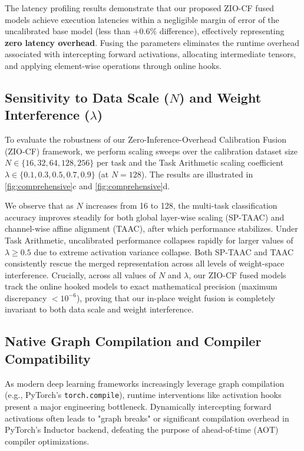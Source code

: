 \documentclass{article}
\begin{document}
The latency profiling results demonstrate that our proposed ZIO-CF fused models achieve execution latencies within a negligible margin of error of the uncalibrated base model (less than $+0.6\%$ difference), effectively representing \textbf{zero latency overhead}. Fusing the parameters eliminates the runtime overhead associated with intercepting forward activations, allocating intermediate tensors, and applying element-wise operations through online hooks.

\subsection{Sensitivity to Data Scale ($N$) and Weight Interference ($\lambda$)}
To evaluate the robustness of our Zero-Inference-Overhead Calibration Fusion (ZIO-CF) framework, we perform scaling sweeps over the calibration dataset size $N \in \{16, 32, 64, 128, 256\}$ per task and the Task Arithmetic scaling coefficient $\lambda \in \{0.1, 0.3, 0.5, 0.7, 0.9\}$ (at $N=128$). The results are illustrated in \cref{fig:comprehensive}c and \cref{fig:comprehensive}d.

We observe that as $N$ increases from 16 to 128, the multi-task classification accuracy improves steadily for both global layer-wise scaling (SP-TAAC) and channel-wise affine alignment (TAAC), after which performance stabilizes. Under Task Arithmetic, uncalibrated performance collapses rapidly for larger values of $\lambda \ge 0.5$ due to extreme activation variance collapse. Both SP-TAAC and TAAC consistently rescue the merged representation across all levels of weight-space interference. Crucially, across all values of $N$ and $\lambda$, our ZIO-CF fused models track the online hooked models to exact mathematical precision (maximum discrepancy $< 10^{-6}$), proving that our in-place weight fusion is completely invariant to both data scale and weight interference.

\subsection{Native Graph Compilation and Compiler Compatibility}
As modern deep learning frameworks increasingly leverage graph compilation (e.g., PyTorch's \texttt{torch.compile}), runtime interventions like activation hooks present a major engineering bottleneck. Dynamically intercepting forward activations often leads to "graph breaks" or significant compilation overhead in PyTorch's Inductor backend, defeating the purpose of ahead-of-time (AOT) compiler optimizations.
\end{document}
